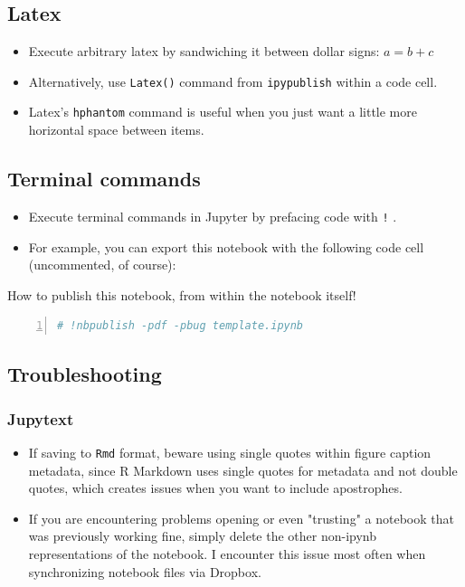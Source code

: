 \documentclass[10pt,parskip=half,
	toc=sectionentrywithdots,
	bibliography=totocnumbered,
	captions=tableheading,
    numbers=noendperiod,
    headings=standardclasses]{scrartcl}
\providecommand{\tightlist}{%
  \setlength{\itemsep}{0pt}\setlength{\parskip}{0pt}}
\begin{document}
\subsection{Latex}\label{latex}

\begin{itemize}
\tightlist
\item
  Execute arbitrary latex by sandwiching it between dollar signs:
  \(a = b+c\)
\item
  Alternatively, use \texttt{Latex()} command from \texttt{ipypublish}
  within a code cell.
\item
  Latex's \texttt{hphantom} command is useful when you just want a
  little more horizontal space between items.
\end{itemize}

\subsection{Terminal commands}\label{terminal-commands}

\begin{itemize}
\tightlist
\item
  Execute terminal commands in Jupyter by prefacing code with \texttt{!}
  .
\item
  For example, you can export this notebook with the following code cell
  (uncommented, of course):
\end{itemize}

\begin{codecell}[H]

    \caption{How to publish this notebook, from within the notebook itself!}\label{code:publish}\begin{lstlisting}[language=Python,numbers=left,xleftmargin=20pt,xrightmargin=5pt,belowskip=5pt,aboveskip=5pt]
# !nbpublish -pdf -pbug template.ipynb
\end{lstlisting}\end{codecell}

\subsection{Troubleshooting}\label{troubleshooting}

\subsubsection{Jupytext}\label{jupytext}

\begin{itemize}
\tightlist
\item
  If saving to \texttt{Rmd} format, beware using single quotes within
  figure caption metadata, since R Markdown uses single quotes for
  metadata and not double quotes, which creates issues when you want to
  include apostrophes.
\item
  If you are encountering problems opening or even "trusting" a notebook
  that was previously working fine, simply delete the other non-ipynb
  representations of the notebook. I encounter this issue most often
  when synchronizing notebook files via Dropbox.
\end{itemize}

\setlength\bibsep{\baselineskip} %


	
\end{document}
